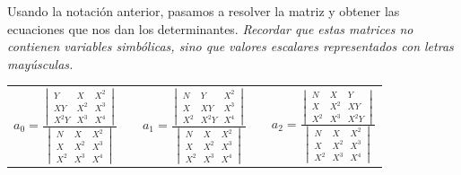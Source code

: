 \documentclass[11pt,letterpaper]{article}
\begin{document}
Usando la notación anterior, pasamos a resolver la matriz y obtener las ecuaciones que nos dan los determinantes. \emph{Recordar que estas matrices no contienen variables simbólicas, sino que valores escalares representados con letras mayúsculas.}
\begin{table}[H] \centering \begin{tabular}{c c c c c}
$a_0 = \frac{
		\begin{vmatrix}
		 	Y &	X	& X^2 \\
		 	XY &	X^2	& X^3 \\
		 	X^2Y & X^3 & X^4	 
		\end{vmatrix}}
		{\begin{vmatrix}
		 	N &	X	& X^2 \\
		 	X &	X^2	& X^3 \\
		 	X^2 & X^3 & X^4	 
		\end{vmatrix}}
		
$ & &
$ a_1 = \frac{
		\begin{vmatrix}
		 	N &	Y	& X^2 \\
		 	X &	XY	& X^3 \\
		 	X^2 & X^2Y & X^4 
		\end{vmatrix}}
		{\begin{vmatrix}
		 	N &	X	& X^2 \\
		 	X &	X^2	& X^3 \\
		 	X^2 & X^3 & X^4	 
		\end{vmatrix}}
$ & &
$ a_2 = \frac{
		\begin{vmatrix}
		 	N &	X	& Y \\
		 	X &	X^2	& XY \\
		 	X^2 & X^3 & X^2Y 
		\end{vmatrix}}
		{\begin{vmatrix}
		 	N &	X	& X^2 \\
		 	X &	X^2	& X^3 \\
		 	X^2 & X^3 & X^4	 
		\end{vmatrix}}
$ \\
\end{tabular} \end{table}
\end{document}
